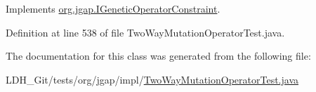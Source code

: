 Implements \hyperlink{interfaceorg_1_1jgap_1_1_i_genetic_operator_constraint_aad6e4b9c79f35e6e569e8d3c98876c50}{org.\-jgap.\-I\-Genetic\-Operator\-Constraint}.



Definition at line 538 of file Two\-Way\-Mutation\-Operator\-Test.\-java.



The documentation for this class was generated from the following file\-:\begin{DoxyCompactItemize}
\item 
L\-D\-H\-\_\-\-Git/tests/org/jgap/impl/\hyperlink{_two_way_mutation_operator_test_8java}{Two\-Way\-Mutation\-Operator\-Test.\-java}\end{DoxyCompactItemize}
